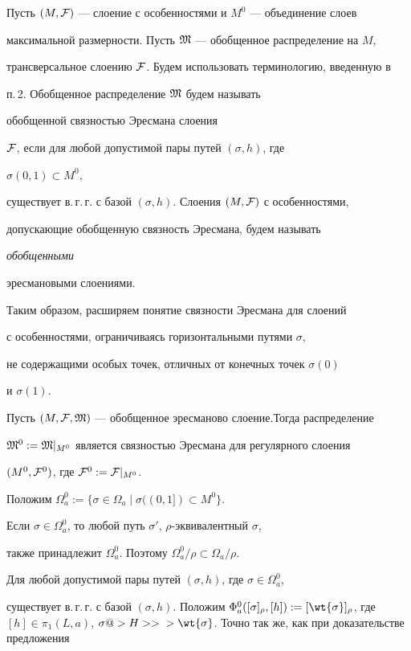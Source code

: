 Пусть $(M,\cal F)$ --- слоение с особенностями и $M^0$ --- объединение слоев


максимальной размерности. Пусть $\frak M$ --- обобщенное распределение на $M$,


трансверсальное слоению $\cal F$. Будем использовать терминологию, введенную в 


п.\,2. Обобщенное распределение $\frak M$ будем называть {\it


обобщенной связностью Эресмана слоения}


$\cal F$, если для любой допустимой пары путей $(\sigma,h)$, где


$\sigma(0,1)\subset M^0$,


существует в.\,г.\,г. с базой $(\sigma,h)$. Слоения $(M,\cal F)$  с особенностями,


допускающие обобщенную связность Эресмана, будем называть {\it обобщенными


эресмановыми слоениями.}


Таким образом, расширяем понятие связности Эресмана для слоений


с особенностями, ограничиваясь горизонтальными путями $\sigma$,


не содержащими особых точек, отличных от конечных точек $\sigma(0)$


и $\sigma(1)$.





Пусть $(M,{\cal F},\frak M)$ ---  обобщенное эресманово слоение.Тогда распределение


${\frak M}^0:={\frak M}|_{M^0}$ является связностью Эресмана для регулярного слоения


$(M^0,{\cal F}^0)$, где ${\cal F}^0:={\cal F}|_{M^0}$.


Положим $\Omega^0_a:=\{\sigma\in\Omega_a\mid\sigma((0,1])\subset M^0\}$.


Если $\sigma\in\Omega^0_a$, то любой путь $\sigma'$, $\rho$-эквивалентный $\sigma$,


также принадлежит $\Omega^0_a$. Поэтому $\Omega^0_a/\rho\subset\Omega_a/\rho$.


Для любой допустимой пары путей  $(\sigma,h)$, где $\sigma\in\Omega^0_a$,


существует в.\,г.\,г. с базой $(\sigma,h)$. Положим $\Phi^0_a([\sigma]_{\rho},[h]):=


[\wt{\sigma}]_{\rho}$, где $[h]\in\pi_1(L,a)$, $\sigma@> H>>{}


>\wt{\sigma}$. Точно так же, как при доказательстве предложения


